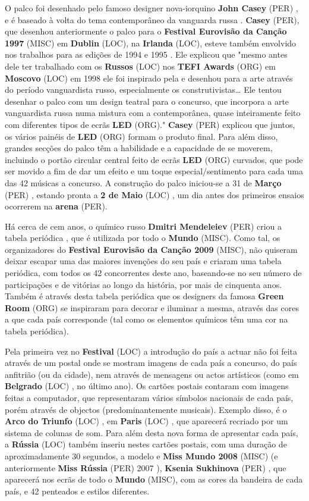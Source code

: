 \documentclass[12pt,a4paper]{article}
\begin{document}
O palco foi desenhado pelo famoso designer nova-iorquino \textbf{John Casey} (PER) , e é baseado à volta do tema contemporâneo da vanguarda russa . \textbf{Casey} (PER), que desenhou anteriormente o palco para o \textbf{Festival Eurovisão da Canção 1997} (MISC) em \textbf{Dublin} (LOC), na \textbf{Irlanda} (LOC), esteve também envolvido nos trabalhos para as edições de 1994 e 1995 . Ele explicou que "mesmo antes dele ter trabalhado com os \textbf{Russos} (LOC) nos \textbf{TEFI Awards} (ORG) em \textbf{Moscovo} (LOC) em 1998 ele foi inspirado pela e desenhou para a arte através do período vanguardista russo, especialmente os construtivistas… Ele tentou desenhar o palco com um design teatral para o concurso, que incorpora a arte vanguardista russa numa mistura com a contemporânea, quase inteiramente feito com diferentes tipos de ecrãs \textbf{LED} (ORG)." \textbf{Casey} (PER) explicou que juntos, os vários painéis de \textbf{LED} (ORG) formam o produto final. Para além disso, grandes secções do palco têm a habilidade e a capacidade de se moverem, incluindo o portão circular central feito de ecrãs \textbf{LED} (ORG) curvados, que pode ser movido a fim de dar um efeito e um toque especial/sentimento para cada uma das 42 músicas a concurso. A construção do palco iniciou-se a 31 de \textbf{Março} (PER) , estando pronta a \textbf{2 de Maio} (LOC) , um dia antes dos primeiros ensaios ocorrerem na \textbf{arena} (PER).

Há cerca de cem anos, o químico russo \textbf{Dmitri Mendeleiev} (PER) criou a tabela periódica , que é utilizada por todo o \textbf{Mundo} (MISC). Como tal, os organizadores do \textbf{Festival Eurovisão da Canção 2009} (MISC), não quiseram deixar escapar uma das maiores invenções do seu país e criaram uma tabela periódica, com todos os 42 concorrentes deste ano, baseando-se no seu número de participações e de vitórias ao longo da história, por mais de cinquenta anos. Também é através desta tabela periódica que os designers da famosa \textbf{Green Room} (ORG) se inspiraram para decorar e iluminar a mesma, através das cores a que cada país corresponde (tal como os elementos químicos têm uma cor na tabela periódica).

Pela primeira vez no \textbf{Festival} (LOC) a introdução do país a actuar não foi feita através de um postal onde se mostram imagens de cada país a concurso, do país anfitrião (ou da cidade), nem através de mensagens ou actos artísticos (como em \textbf{Belgrado} (LOC) , no último ano). Os cartões postais contaram com imagens feitas a computador, que representaram vários símbolos nacionais de cada país, porém através de objectos (predominantemente musicais). Exemplo disso, é o \textbf{Arco do Triunfo} (LOC) , em \textbf{Paris} (LOC) , que aparecerá recriado por um sistema de colunas de som. Para além desta nova forma de apresentar cada país, a \textbf{Rússia} (LOC) também inseriu nestes cartões postais, com uma duração de aproximadamente 30 segundos, a modelo e \textbf{Miss Mundo 2008} (MISC) (e anteriormente \textbf{Miss Rússia} (PER) 2007 ), \textbf{Ksenia Sukhinova} (PER) , que aparecerá nos ecrãs de todo o \textbf{Mundo} (MISC), com as cores da bandeira de cada país, e 42 penteados e estilos diferentes.
\end{document}
